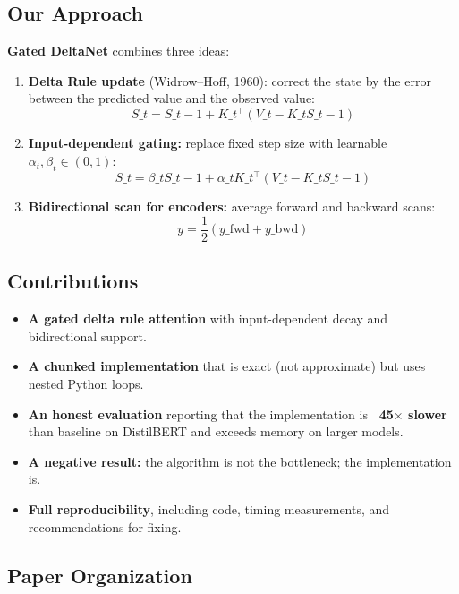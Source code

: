\subsection{Our Approach}

\textbf{Gated DeltaNet} combines three ideas:

\begin{enumerate}
\item \textbf{Delta Rule update} (Widrow--Hoff, 1960): correct the state by the error
  between the predicted value and the observed value:
  $$
  S\_t = S\_{t-1} + K\_t^\top (V\_t - K\_t S\_{t-1})
  \tag{1.2}
  $$

\item \textbf{Input-dependent gating:} replace fixed step size with learnable
  $\alpha_t, \beta_t \in (0, 1)$:
  $$
  S\_t = \beta\_t S\_{t-1} + \alpha\_t K\_t^\top (V\_t - K\_t S\_{t-1})
  \tag{1.3}
  $$

\item \textbf{Bidirectional scan for encoders:} average forward and backward scans:
  $$
  y = \frac{1}{2}(y\_{\text{fwd}} + y\_{\text{bwd}})
  \tag{1.4}
  $$

\end{enumerate}
\subsection{Contributions}

\begin{itemize}
\item \textbf{A gated delta rule attention} with input-dependent decay and
  bidirectional support.
\item \textbf{A chunked implementation} that is exact (not approximate) but uses
  nested Python loops.
\item \textbf{An honest evaluation} reporting that the implementation is
  \textbf{~45$\times$ slower} than baseline on DistilBERT and exceeds memory on larger
  models.
\item \textbf{A negative result:} the algorithm is not the bottleneck; the
  implementation is.
\item \textbf{Full reproducibility}, including code, timing measurements, and
  recommendations for fixing.

\end{itemize}
\subsection{Paper Organization}


